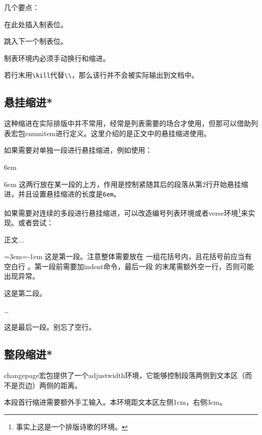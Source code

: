几个要点：
\begin{para}
\item[\char92{}=] 在此处插入制表位。
\item[\char92{}>] 跳入下一个制表位。
\item[\char92{}\char92{}] 制表环境内必须手动换行和缩进。
\item[\char92{}kill] 若行末用\verb|\kill|代替\verb|\\|，那么该行并不会被实际输出到文档中。
\end{para}

\subsection{悬挂缩进*}
这种缩进在实际排版中并不常用，经常是列表需要的场合才使用，但那可以借助列表宏包enumitem进行定义。这里介绍的是正文中的悬挂缩进使用。

如果需要对单独一段进行悬挂缩进，例如使用：
\begin{latex}{}
\hangindent 6em
\end{latex}

\hangindent 6em
这两行放在某一段的上方，作用是控制紧随其后的段落从第2行开始悬挂缩进，并且设置悬挂缩进的长度是\texttt{6em}。

如果需要对连续的多段进行悬挂缩进，可以改造编号列表环境或者verse环境\footnote{事实上这是一个排版诗歌的环境。}来实现。或者尝试：

\begin{codeshow}
正文...

{\leftskip=3em\parindent=-1em
\indent 这是第一段。注意整体需要放在
一组花括号内，且花括号前应当有空白行
。第一段前需要加indent命令，最后一段
的末尾需额外空一行，否则可能出现异常。

这是第二段。

\ldots

这是最后一段。别忘了空行。

}
\end{codeshow}

\subsection{整段缩进*}
changepage宏包提供了一个adjustwidth环境，它能够控制段落两侧到文本区（而不是页边）两侧的距离。
\begin{latex}{}
\begin{adjustwidth}{1cm}{3cm}
本段首行缩进需要额外手工输入。本环境距文本区左侧1cm，右侧3cm。
\end{adjustwidth}
\end{latex}

